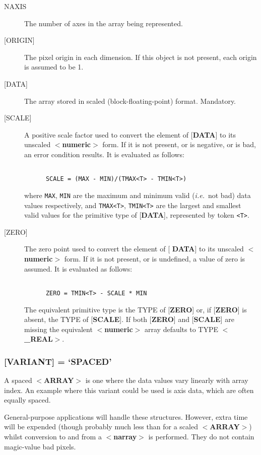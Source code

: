 \begin{description}
\item [NAXIS]
The number of axes in the array being represented.
\item [{[}ORIGIN{]}]
The pixel origin in each dimension.  If this object is not present,
each origin is assumed to be 1. 
\item [{[}DATA{]}] 
The array stored in scaled (block-floating-point) format. Mandatory.
\item [{[}SCALE{]}]
A positive scale factor used to convert the element of
{[}{\bf DATA}{]} to its
unscaled $<${\bf numeric}$>$ form.  If it is not present,
or is negative, or is bad, an error condition results.
It is evaluated as follows:
\begin{verbatim}

      SCALE = (MAX - MIN)/(TMAX<T> - TMIN<T>)

\end{verbatim}
where {\tt MAX}, {\tt MIN} are the maximum and minimum valid ({\it i.e.}\  not bad)
data values respectively, and {\tt TMAX<T>}, {\tt TMIN<T>}  are
the largest and smallest valid values for the primitive type of {[}{\bf DATA}{]}, represented
by token {\tt <T>}.
\item [{[}ZERO{]}]
The zero point used to convert the element of {[}{\bf
DATA}{]} to its unscaled $<${\bf numeric}$>$ form.  If it is not
present,
or is undefined, a value of zero is assumed.  It is evaluated as follows:
\begin{verbatim}

      ZERO = TMIN<T> - SCALE * MIN

\end{verbatim}

The equivalent primitive type is the TYPE of {[}{\bf ZERO}{]} or, if
{[}{\bf ZERO}{]} is absent, the TYPE of {[}{\bf SCALE}{]}.  If both
{[}{\bf ZERO}{]} and {[}{\bf SCALE}{]} are missing the equivalent
$<${\bf numeric}$>$ array defaults to TYPE $<${\bf \_REAL}$>$. 
\end{description}

\subsubsection{{[}{\bf VARIANT}{]} = `SPACED'}
A spaced \mbox{$<${\bf ARRAY}$>$} is one where the data values
vary linearly with array index.
An example where this variant could be used is axis data, which are
often equally spaced.

General-purpose applications will handle these structures.  However,
extra time will be expended (though probably much less than for a
scaled \mbox{$<${\bf ARRAY}$>$}) whilst conversion to
and from a $<${\bf narray}$>$ is performed.
They do not contain magic-value bad pixels.

